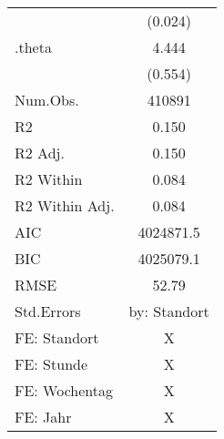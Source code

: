 \begin{table}
\begin{tabular}[t]{lc}
 & (\num{0.024})\\
.theta & \num{4.444}\\
 & (\num{0.554})\\
\midrule
Num.Obs. & \num{410891}\\
R2 & \num{0.150}\\
R2 Adj. & \num{0.150}\\
R2 Within & \num{0.084}\\
R2 Within Adj. & \num{0.084}\\
AIC & \num{4024871.5}\\
BIC & \num{4025079.1}\\
RMSE & \num{52.79}\\
Std.Errors & by: Standort\\
FE: Standort & X\\
FE: Stunde & X\\
FE: Wochentag & X\\
FE: Jahr & X\\
\bottomrule
\end{tabular}
\end{table}

